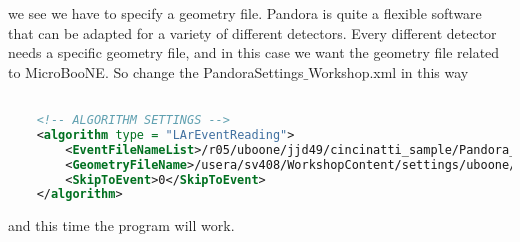we see we have to specify a geometry file. Pandora is quite a flexible software that can be adapted for a variety of different detectors. Every different detector needs a specific geometry file, and in this case we want the geometry file related to MicroBooNE. So change the PandoraSettings${\_}$Workshop.xml in this way

\begin{lstlisting}[language=XML, caption=Python example]

    <!-- ALGORITHM SETTINGS -->
    <algorithm type = "LArEventReading">
        <EventFileNameList>/r05/uboone/jjd49/cincinatti_sample/Pandora_Events_Cincinatti_BNB_NuMu_1714.pndr</EventFileNameList>
        <GeometryFileName>/usera/sv408/WorkshopContent/settings/uboone/Geometry_MicroBooNE.xml</GeometryFileName>
        <SkipToEvent>0</SkipToEvent>
    </algorithm>

\end{lstlisting}

and this time the program will work.
